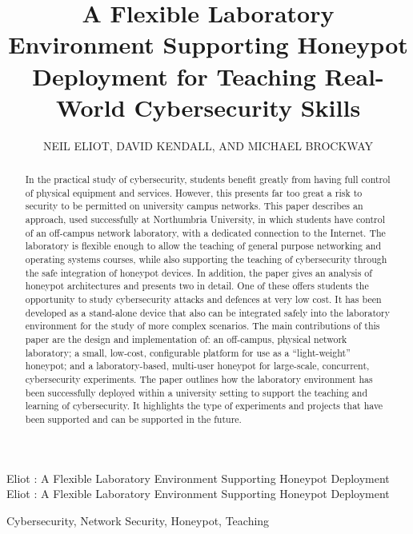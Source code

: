 \documentclass{ieeeaccess}
\begin{document}
  
  \title{A Flexible Laboratory Environment Supporting Honeypot Deployment for Teaching Real-World Cybersecurity Skills}
  \author{\uppercase{Neil Eliot},
  \uppercase{David Kendall, and Michael Brockway}}
  \address[1]{Northumbria University, Department of Computing and Information Sciences, 
  Newcastle upon Tyne, NE1 8ST}
  
  \markboth
  {Eliot \headeretal: A Flexible Laboratory Environment Supporting Honeypot Deployment}
  {Eliot \headeretal: A Flexible Laboratory Environment Supporting Honeypot Deployment}
  
  
\begin{abstract}
  In the practical study of cybersecurity, students benefit greatly from having
  full control of physical equipment and services. However, this presents far
  too great a risk to security to be permitted on university campus networks.
  This paper describes an approach, used successfully at Northumbria
  University, in which students have control of an off-campus network
  laboratory, with a dedicated connection to the Internet.  The laboratory is
  flexible enough to allow the teaching of general purpose networking and
  operating systems courses, while also supporting the teaching of
  cybersecurity through the safe integration of honeypot devices. In addition,
  the paper gives an analysis of honeypot architectures and presents two in
  detail. One of these offers students the opportunity to study cybersecurity
  attacks and defences at very low cost.  It has been developed as a
  stand-alone device that also can be integrated safely into the laboratory
  environment for the study of more complex scenarios.  The main contributions
  of this paper are the design and implementation of: an off-campus, physical
  network laboratory; a small, low-cost, configurable platform for use as a
  ``light-weight'' honeypot; and a laboratory-based, multi-user honeypot for
  large-scale, concurrent, cybersecurity experiments.  The paper outlines how
  the laboratory environment has been successfully deployed within a university
  setting to support the teaching and learning of cybersecurity. It highlights
  the type of experiments and projects that have been supported and can be
  supported in the future.
\end{abstract}
\begin{IEEEkeywords}
  Cybersecurity, Network Security, Honeypot, Teaching
\end{IEEEkeywords}
\titlepgskip=-15pt
\maketitle
\end{document}
